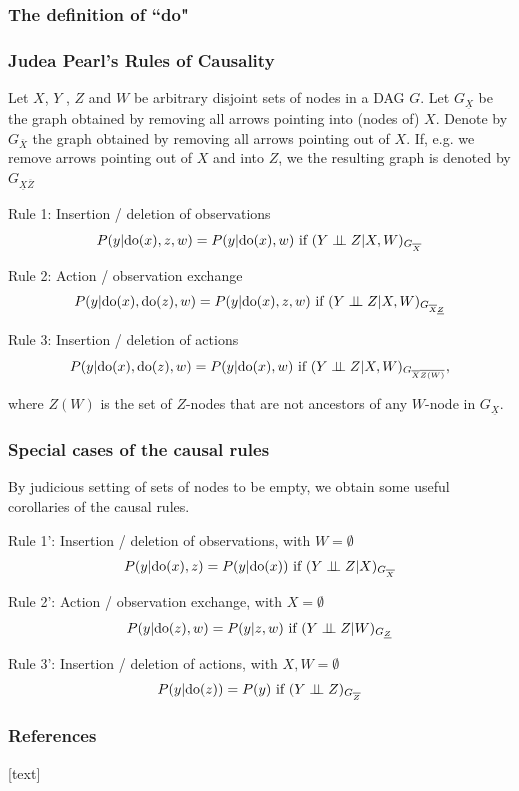 \begin{frame}
    \frametitle{The definition of ``do"}
\end{frame}
\begin{frame}
\frametitle{Judea Pearl's Rules of Causality}

Let $X$, $Y$ , $Z$ and $W$ be arbitrary disjoint sets of nodes in a DAG $G$. Let $G_\underline{X}$ be the graph obtained by removing all arrows pointing into (nodes of) $X$. 
Denote by $G_{\overline{X}}$ the graph obtained by removing all arrows pointing out of $X$. If, e.g. we remove arrows pointing out of $X$ and into $Z$, we the resulting graph is denoted by $G_{\underline{X} \overline{Z}}$

Rule 1: Insertion / deletion of observations
\begin{equation*}
P(y | \mathrm{do}(x), z, w) = P(y | \mathrm{do}(x), w) \textrm{ if } (Y \perp\!\!\!\perp Z | X, W)_{G_{\overline{X}}}
\end{equation*}

Rule 2: Action / observation exchange
\begin{equation*}
P(y | \mathrm{do}(x), \mathrm{do}(z), w) = P(y | \mathrm{do}(x), z, w) \textrm{ if } (Y \perp\!\!\!\perp Z | X, W)_{G_{\overline{X} \underline{Z}}}
\end{equation*}

Rule 3: Insertion / deletion of actions
\begin{equation*}
P(y | \mathrm{do}(x), \mathrm{do}(z), w) = P(y | \mathrm{do}(x), w) \textrm{ if } (Y \perp\!\!\!\perp Z | X, W)_{G_{\overline{X} \overline{Z(W)}}},
\end{equation*}

where $Z(W)$ is the set of $Z$-nodes that are not ancestors of any $W$-node in $G_\underline{X}$.

\end{frame}

\begin{frame}
\frametitle{Special cases of the causal rules}

By judicious setting of sets of nodes to be empty, we obtain some useful corollaries of the causal rules.
\newline

Rule 1': Insertion / deletion of observations, with $W = \emptyset$
\begin{equation*}
    P(y | \mathrm{do}(x), z) = P(y | \mathrm{do}(x)) \textrm{ if } (Y \perp\!\!\!\perp Z | X)_{G_{\overline{X}}}
\end{equation*}

Rule 2': Action / observation exchange, with $X = \emptyset$
\begin{equation*}
P(y | \mathrm{do}(z), w) = P(y | z, w) \textrm{ if } (Y \perp\!\!\!\perp Z | W)_{G_{ \underline{Z}}}
\end{equation*}

Rule 3': Insertion / deletion of actions, with $X, W = \emptyset$
\begin{equation*}
P(y | \mathrm{do}(z)) = P(y) \textrm{ if } (Y \perp\!\!\!\perp Z )_{G_{\overline{Z}}}
\end{equation*}

\end{frame}

\begin{frame}[allowframebreaks]
    \frametitle{References}
    [text]
    
    
\end{frame}

